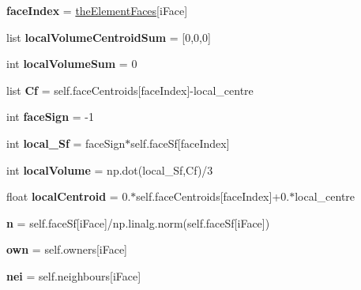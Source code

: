 \begin{DoxyCompactItemize}
{\bfseries face\+Index} = \mbox{\hyperlink{classpy_f_v_m_1_1_polymesh_1_1_polymesh_a78aa9d2d0f23abfe2c8a5a1b276c07bd}{the\+Element\+Faces}}\mbox{[}i\+Face\mbox{]}
\item 
\mbox{\label{classpy_f_v_m_1_1_polymesh_1_1_polymesh_ae2ab35047459c52944fb277d060ac290}} 
list {\bfseries local\+Volume\+Centroid\+Sum} = \mbox{[}0,0,0\mbox{]}
\item 
\mbox{\label{classpy_f_v_m_1_1_polymesh_1_1_polymesh_a129290f51706f42e9a48688d740a423c}} 
int {\bfseries local\+Volume\+Sum} = 0
\item 
\mbox{\label{classpy_f_v_m_1_1_polymesh_1_1_polymesh_a0c20a6b4227b3207381e8d525169a5f2}} 
list {\bfseries Cf} = self.\+face\+Centroids\mbox{[}face\+Index\mbox{]}-\/local\+\_\+centre
\item 
\mbox{\label{classpy_f_v_m_1_1_polymesh_1_1_polymesh_a6ba32d629ad386ea58d7e87b5571d1b1}} 
int {\bfseries face\+Sign} = -\/1
\item 
\mbox{\label{classpy_f_v_m_1_1_polymesh_1_1_polymesh_a0b1b07e52d4facfdf47f113ff50da44e}} 
int {\bfseries local\+\_\+\+Sf} = face\+Sign$\ast$self.\+face\+Sf\mbox{[}face\+Index\mbox{]}
\item 
\mbox{\label{classpy_f_v_m_1_1_polymesh_1_1_polymesh_ac70fdb3d2000a61a010a738ce982f4ac}} 
int {\bfseries local\+Volume} = np.\+dot(local\+\_\+\+Sf,Cf)/3
\item 
\mbox{\label{classpy_f_v_m_1_1_polymesh_1_1_polymesh_a3d77d4d353244780b3d27575c492b2ac}} 
float {\bfseries local\+Centroid} = 0.$\ast$self.\+face\+Centroids\mbox{[}face\+Index\mbox{]}+0.$\ast$local\+\_\+centre
\item 
\mbox{\label{classpy_f_v_m_1_1_polymesh_1_1_polymesh_a54a4fe6f2a20f912c596000cfa9ce3d9}} 
{\bfseries n} = self.\+face\+Sf\mbox{[}i\+Face\mbox{]}/np.\+linalg.\+norm(self.\+face\+Sf\mbox{[}i\+Face\mbox{]})
\item 
\mbox{\label{classpy_f_v_m_1_1_polymesh_1_1_polymesh_ab3239247dc307b76d420c0f5588a9684}} 
{\bfseries own} = self.\+owners\mbox{[}i\+Face\mbox{]}
\item 
\mbox{\label{classpy_f_v_m_1_1_polymesh_1_1_polymesh_a256aff58d0fb2d3a9541639167691ef2}} 
{\bfseries nei} = self.\+neighbours\mbox{[}i\+Face\mbox{]}
\end{DoxyCompactItemize}


